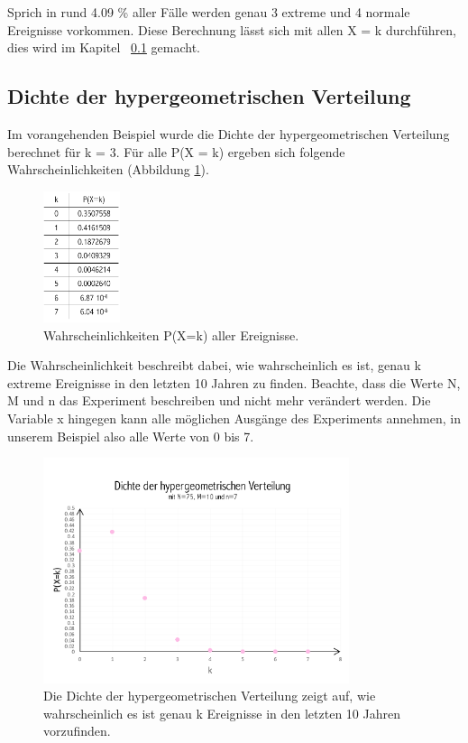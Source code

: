\begin{refsection}
Sprich in rund 4.09 \% aller Fälle werden genau 3 extreme und 4 normale Ereignisse vorkommen. Diese Berechnung lässt sich mit allen X = k durchführen, dies wird im Kapitel ~\ref{Dichtehyper}  gemacht.


\subsection{Dichte der hypergeometrischen Verteilung} \label{Dichtehyper}
Im vorangehenden Beispiel wurde die Dichte der hypergeometrischen Verteilung berechnet für k = 3. Für alle P(X = k) ergeben sich folgende Wahrscheinlichkeiten (Abbildung \ref{TabHyper}).

\begin{figure}[htbp]
\centering
\includegraphics[width=0.2\textwidth]{extrem/TabHyper.pdf}
\caption{Wahrscheinlichkeiten P(X=k) aller Ereignisse.}
\label{TabHyper}
\end{figure}

Die Wahrscheinlichkeit beschreibt dabei, wie wahrscheinlich es ist, genau k extreme Ereignisse in den letzten 10 Jahren zu finden.
Beachte, dass die Werte N, M und n das Experiment beschreiben und nicht mehr verändert werden. Die Variable x hingegen kann alle möglichen Ausgänge des Experiments annehmen, in unserem Beispiel also alle Werte von 0 bis 7.

\begin{figure}[htbp]
\centering
\includegraphics[width=0.8\textwidth]{extrem/Hyper.pdf}
\caption{Die Dichte der hypergeometrischen Verteilung zeigt auf, wie wahrscheinlich es ist genau k Ereignisse in den letzten 10 Jahren vorzufinden.}
\label{Hyper}
\end{figure}


\end{refsection}
